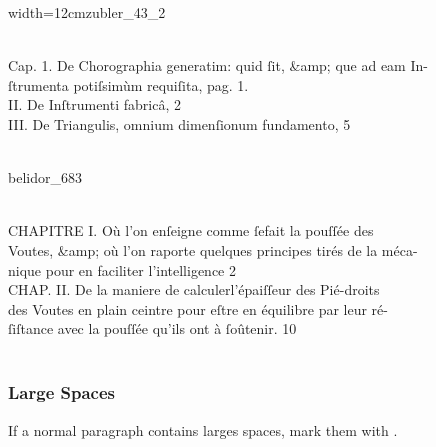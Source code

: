 \begin{sampleImageSmall}[ 1]{width=12cm}{zubler_43_2}

\begin{typeLatin}
 \\
Cap. 1.  De Chorographia generatim: quid ſit, &amp; que ad eam In-\\
 ſtrumenta poti{ſs}imùm requiſita,  pag. 1. \\
II.  De Inſtrumenti fabricâ,  2 \\
III.  De Triangul{is}, omnium dimenſionum fundamento,  5 \\
\someText \\
\end{typeLatin}
\end{sampleImageSmall}


\begin{sampleImage}[ 2]{belidor_683}

\begin{typeLatin}
 \\
CHAPITRE I. Où l'on enſeigne comme ſe\lwr fait la pouſſée des \\
 Voutes, &amp; où l'on raporte quelques principes tirés de la méca- \\
 nique pour en faciliter l'intelligence  2 \\
CHAP. II.  De la maniere de calculer\lwr l'épaiſſeur des Pié-droits \\
 des Voutes en plain ceintre pour eſtre en équilibre par leur ré- \\
 ſiſtance avec la pouſſée qu'ils ont à ſoûtenir.  10  \\
 \\
\end{typeLatin}
\end{sampleImage}


\subsubsection{Large Spaces}
\begin{mainrule}
If a normal paragraph contains larges spaces, mark them with .
\end{mainrule}

